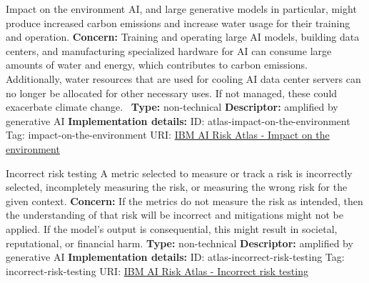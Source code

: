 \documentclass[a4paper,12pt]{article}
\begin{document}
\begin{definitionbox}{Impact on the environment}
AI, and large generative models in particular, might produce increased carbon emissions and increase water usage for their training and operation.\newline\newline
\textbf{Concern: }Training and operating large AI models, building data centers, and manufacturing specialized hardware for AI can consume large amounts of water and energy, which contributes to carbon emissions. Additionally, water resources that are used for cooling AI data center servers can no longer be allocated for other necessary uses. If not managed, these could exacerbate climate change. \newline\newline
\textbf{Type: }non-technical\newline
\textbf{Descriptor: }amplified by generative AI \newline\newline
\textbf{Implementation details: } \newline
ID: atlas-impact-on-the-environment \newline
Tag: impact-on-the-environment \newline
URI:  \href{https://www.ibm.com/docs/en/watsonx/saas?topic=SSYOK8/wsj/ai-risk-atlas/impact-on-the-environment.html}{IBM AI Risk Atlas - Impact on the environment}\newline
\end{definitionbox}
\begin{definitionbox}{Incorrect risk testing}
A metric selected to measure or track a risk is incorrectly selected, incompletely measuring the risk, or measuring the wrong risk for the given context.\newline\newline
\textbf{Concern: }If the metrics do not measure the risk as intended, then the understanding of that risk will be incorrect and mitigations might not be applied. If the model's output is consequential, this might result in societal, reputational, or financial harm.\newline\newline
\textbf{Type: }non-technical\newline
\textbf{Descriptor: }amplified by generative AI \newline\newline
\textbf{Implementation details: } \newline
ID: atlas-incorrect-risk-testing \newline
Tag: incorrect-risk-testing \newline
URI:  \href{https://www.ibm.com/docs/en/watsonx/saas?topic=SSYOK8/wsj/ai-risk-atlas/incorrect-risk-testing.html}{IBM AI Risk Atlas - Incorrect risk testing}\newline
\end{definitionbox}
\end{document}
